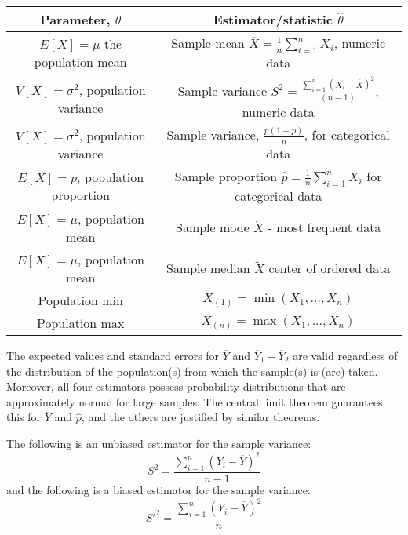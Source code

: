 \documentclass[12pt, a4paper, twoside, openright, titlepage]{book}
\begin{document}
\begin{table}[H]
    \centering
    \begin{tabular}{c|c}
        Parameter, $\theta$ & Estimator/statistic $\hat{\theta}$ \\ \hline
        $E[X] = \mu$ the population mean & Sample mean $\overline{X} = \frac{1}{n}\sum_{i=1}^nX_i$, numeric data \\
        $V[X] = \sigma^2$, population variance & Sample variance $S^2 = \frac{\sum_{i=1}^n(X_i - \overline{X})^2}{(n-1)}$, numeric data \\
        $V[X] = \sigma^2$, population variance & Sample variance, $\frac{p(1-p)}{n}$, for categorical data \\
        $E[X] = p$, population proportion & Sample proportion $\hat{p} = \frac{1}{n}\sum_{i=1}^nX_i$ for categorical data \\
        $E[X] = \mu$, population mean & Sample mode $\dot{X}$ - most frequent data \\
        $E[X] = \mu$, population mean & Sample median $\widetilde{X}$ center of ordered data \\
        Population min & $X_{(1)} = \min(X_1,...,X_n)$ \\
        Population max & $X_{(n)} = \max(X_1,...,X_n)$ \\
    \end{tabular}
\end{table}

The expected values and standard errors for $\overline{Y}$ and $\overline{Y}_1 - \overline{Y}_2$ are valid regardless of the distribution of the population(s) from which the sample(s) is (are) taken. Moreover, all four estimators possess probability distributions that are approximately normal for large samples. The central limit theorem guarantees this for $\overline{Y}$ and $\hat{p}$, and the others are justified by similar theorems.

\begin{defn}{}{}
    The following is an unbiased estimator for the sample variance: \begin{equation*}
        S^2 = \frac{\sum_{i=1}^n(Y_i-\overline{Y})^2}{n-1}
    \end{equation*}
    and the following is a biased estimator for the sample variance: \begin{equation*}
        S'^2 = \frac{\sum_{i=1}^n(Y_i - \overline{Y})^2}{n} 
    \end{equation*}
\end{defn}
\end{document}
